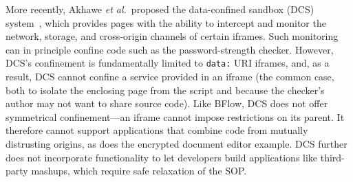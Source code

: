 More recently, Akhawe \emph{et al.}~proposed the data-confined
sandbox (DCS) system~\cite{Akhawe2013}, which provides pages with the
ability to intercept and monitor the network, storage, and cross-origin
channels of certain iframes.
%
Such monitoring can in principle confine code such as the
password-strength checker.
%
However, DCS's confinement is fundamentally limited to \verb|data:|
URI iframes, and, as a result, DCS cannot confine a service provided
in an iframe (the common case, both to isolate the enclosing page from
the script and because the checker's author may not want to share
source code).
%
Like BFlow, DCS does not offer symmetrical confinement---an iframe
cannot impose restrictions on its parent. It therefore cannot support
applications that combine code from mutually distrusting origins, as
does the encrypted document editor example.
%
%
DCS further does not incorporate functionality to let developers build
applications like third-party mashups, which require safe relaxation of the
SOP.
%






